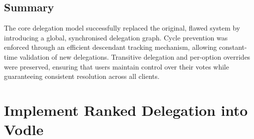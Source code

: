     






\subsection{Summary}

The core delegation model successfully replaced the original, flawed system by introducing a global, synchronised delegation graph. Cycle prevention was enforced through an efficient descendant tracking mechanism, allowing constant-time validation of new delegations. Transitive delegation and per-option overrides were preserved, ensuring that users maintain control over their votes while guaranteeing consistent resolution across all clients.

\section{Implement Ranked Delegation into Vodle}\label{sec:design_ranked_delegation}

